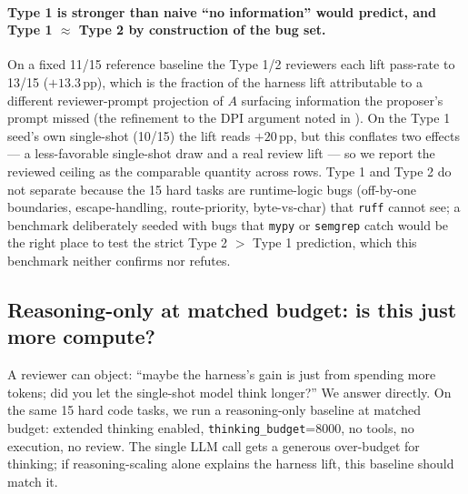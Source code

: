 \documentclass[11pt]{article}
\begin{document}
\paragraph{Type 1 is stronger than naive ``no information'' would predict, and Type 1 $\approx$ Type 2 by construction of the bug set.} On a fixed 11/15 reference baseline the Type 1/2 reviewers each lift pass-rate to 13/15 ($+13.3$\,pp), which is the fraction of the harness lift attributable to a different reviewer-prompt projection of $A$ surfacing information the proposer's prompt missed (the refinement to the DPI argument noted in ). On the Type 1 seed's own single-shot (10/15) the lift reads $+20$\,pp, but this conflates two effects --- a less-favorable single-shot draw and a real review lift --- so we report the reviewed ceiling as the comparable quantity across rows. Type 1 and Type 2 do not separate because the 15 hard tasks are runtime-logic bugs (off-by-one boundaries, escape-handling, route-priority, byte-vs-char) that \texttt{ruff} cannot see; a benchmark deliberately seeded with bugs that \texttt{mypy} or \texttt{semgrep} catch would be the right place to test the strict Type 2 $>$ Type 1 prediction, which this benchmark neither confirms nor refutes.

\subsection{Reasoning-only at matched budget: is this just more compute?}
\label{sec:harness-reasoning}

A reviewer can object: ``maybe the harness's gain is just from spending more tokens; did you let the single-shot model think longer?'' We answer directly. On the same 15 hard code tasks, we run a reasoning-only baseline at matched budget: extended thinking enabled, \texttt{thinking\_budget}=8000, no tools, no execution, no review. The single LLM call gets a generous over-budget for thinking; if reasoning-scaling alone explains the harness lift, this baseline should match it.
\end{document}

